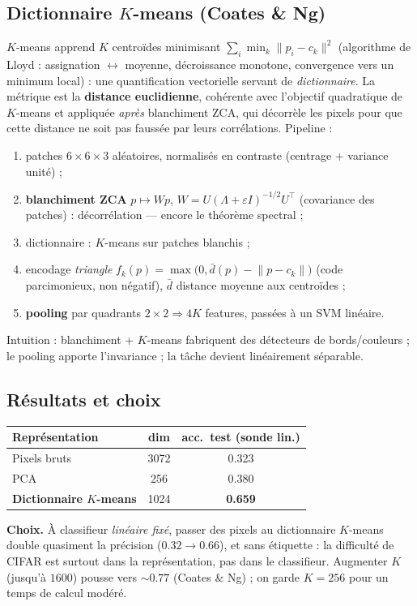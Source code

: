 \documentclass[11pt,a4paper]{article}
\newcommand{\norm}[1]{\lVert #1 \rVert}
\newcommand{\T}{^{\top}}
\begin{document}
\subsection{Dictionnaire $K$-means (Coates \& Ng)}
$K$-means apprend $K$ centroïdes minimisant $\sum_i\min_k\norm{p_i-c_k}^2$
(algorithme de Lloyd : assignation $\leftrightarrow$ moyenne, décroissance
monotone, convergence vers un minimum local) : une quantification vectorielle
servant de \emph{dictionnaire}. La métrique est la \textbf{distance euclidienne},
cohérente avec l'objectif quadratique de $K$-means et appliquée \emph{après}
blanchiment ZCA, qui décorrèle les pixels pour que cette distance ne soit pas
faussée par leurs corrélations. Pipeline :
\begin{enumerate}\itemsep1pt
  \item patches $6\!\times\!6\!\times\!3$ aléatoires, normalisés en contraste
  (centrage + variance unité) ;
  \item \textbf{blanchiment ZCA} $p\mapsto Wp$, $W=U(\Lambda+\varepsilon I)^{-1/2}U\T$
  (covariance des patches) : décorrélation — encore le théorème spectral ;
  \item dictionnaire : $K$-means sur patches blanchis ;
  \item encodage \emph{triangle}
  $f_k(p)=\max\!\big(0,\bar d(p)-\norm{p-c_k}\big)$ (code parcimonieux, non négatif),
  $\bar d$ distance moyenne aux centroïdes ;
  \item \textbf{pooling} par quadrants $2\!\times\!2 \Rightarrow 4K$ features,
  passées à un SVM linéaire.
\end{enumerate}
Intuition : blanchiment + $K$-means fabriquent des détecteurs de bords/couleurs ;
le pooling apporte l'invariance ; la tâche devient linéairement séparable.

\subsection{Résultats et choix}
\begin{center}
\begin{tabular}{lcc}
\toprule
Représentation & dim & acc.\ test (sonde lin.) \\
\midrule
Pixels bruts                       & 3072 & 0.323 \\
PCA                                & 256  & 0.380 \\
\textbf{Dictionnaire $K$-means}    & 1024 & \textbf{0.659} \\
\bottomrule
\end{tabular}
\end{center}
\noindent\textbf{Choix.} À classifieur \emph{linéaire fixé}, passer des pixels au
dictionnaire $K$-means double quasiment la précision ($0.32\!\to\!0.66$), et sans
étiquette : la difficulté de CIFAR est surtout dans la représentation, pas dans le
classifieur. Augmenter $K$ (jusqu'à $1600$) pousse vers $\sim0.77$ (Coates \& Ng) ;
on garde $K{=}256$ pour un temps de calcul modéré.
\end{document}
